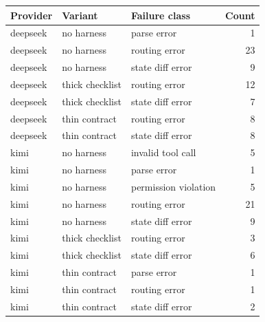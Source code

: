 \begin{tabular}{lllr}
\toprule
Provider & Variant & Failure class & Count \\
\midrule
deepseek & no harness & parse error & 1 \\
deepseek & no harness & routing error & 23 \\
deepseek & no harness & state diff error & 9 \\
deepseek & thick checklist & routing error & 12 \\
deepseek & thick checklist & state diff error & 7 \\
deepseek & thin contract & routing error & 8 \\
deepseek & thin contract & state diff error & 8 \\
kimi & no harness & invalid tool call & 5 \\
kimi & no harness & parse error & 1 \\
kimi & no harness & permission violation & 5 \\
kimi & no harness & routing error & 21 \\
kimi & no harness & state diff error & 9 \\
kimi & thick checklist & routing error & 3 \\
kimi & thick checklist & state diff error & 6 \\
kimi & thin contract & parse error & 1 \\
kimi & thin contract & routing error & 1 \\
kimi & thin contract & state diff error & 2 \\
\bottomrule
\end{tabular}
